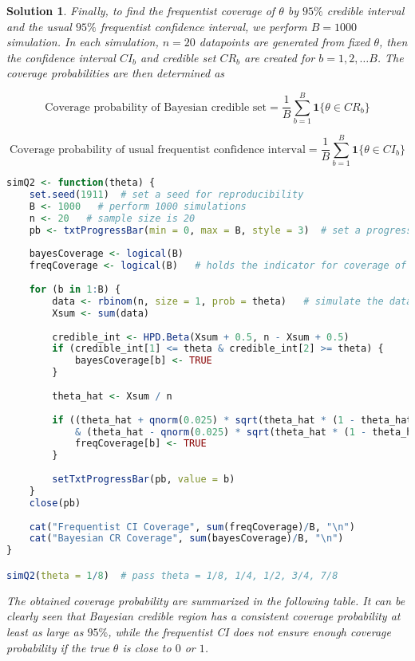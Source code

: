 \documentclass[12pt]{article}
\theoremstyle{problemstyle}
\newtheorem*{solution*}{Solution}
\begin{document}
\begin{solution*}
    Finally, to find the frequentist coverage of $\theta$ by $95\%$ credible interval and the usual $95\%$ frequentist confidence interval, we perform $B = 1000$ simulation. In each simulation, $n = 20$ datapoints are generated from fixed $\theta$, then the confidence interval $CI_b$ and credible set $CR_b$ are created for $b = 1, 2, \dots B$. The coverage probabilities are then determined as 
    
    $$
    \text{Coverage probability of Bayesian credible set} = \dfrac{1}{B}\sum_{b=1}^B \boldsymbol{1}\{ \theta \in CR_b \} 
    $$

    \noindent

    $$
    \text{Coverage probability of usual frequentist confidence interval} = \dfrac{1}{B}\sum_{b=1}^B \boldsymbol{1}\{ \theta \in CI_b \} 
    $$
    

    \begin{lstlisting}[language = R]
simQ2 <- function(theta) {
    set.seed(1911)  # set a seed for reproducibility
    B <- 1000   # perform 1000 simulations
    n <- 20   # sample size is 20
    pb <- txtProgressBar(min = 0, max = B, style = 3)  # set a progress bar
    
    bayesCoverage <- logical(B)
    freqCoverage <- logical(B)   # holds the indicator for coverage of the true theta by 95% CI
    
    for (b in 1:B) {
        data <- rbinom(n, size = 1, prob = theta)   # simulate the data
        Xsum <- sum(data)
        
        credible_int <- HPD.Beta(Xsum + 0.5, n - Xsum + 0.5)
        if (credible_int[1] <= theta & credible_int[2] >= theta) {
            bayesCoverage[b] <- TRUE
        }
        
        theta_hat <- Xsum / n
        
        if ((theta_hat + qnorm(0.025) * sqrt(theta_hat * (1 - theta_hat)/n) <= theta )
            & (theta_hat - qnorm(0.025) * sqrt(theta_hat * (1 - theta_hat)/n) >= theta )) {
            freqCoverage[b] <- TRUE
        }
        
        setTxtProgressBar(pb, value = b)
    }
    close(pb)
    
    cat("Frequentist CI Coverage", sum(freqCoverage)/B, "\n")
    cat("Bayesian CR Coverage", sum(bayesCoverage)/B, "\n")
}

simQ2(theta = 1/8)  # pass theta = 1/8, 1/4, 1/2, 3/4, 7/8
    \end{lstlisting}

    \pagebreak
    The obtained coverage probability are summarized in the following table. It can be clearly seen that Bayesian credible region has a consistent coverage probability at least as large as $95\%$, while the frequentist CI does not ensure enough coverage probability if the true $\theta$ is close to $0$ or $1$.


\end{solution*}
\end{document}
